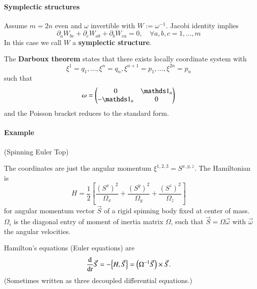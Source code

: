 \paragraph{Symplectic structures}
Assume $m=2n$ even and $\omega$ invertible with $W := \omega^{-1}$. Jacobi identity implies
\begin{equation*}
	\partial_a W_{bc} + \partial_c W_{ab} + \partial_b W_{ca} = 0,\quad \forall a, b, c = 1, \dots, m
\end{equation*}
In this case we call $W$ a \textbf{symplectic structure}.

The \textbf{Darboux theorem} states that there exists locally coordinate system with 
\begin{equation*}
	\xi^1 = q_1, \dots, \xi^n = q_n, \xi^{n+1} = p_1, \dots, \xi^{2n} = p_n
\end{equation*}
such that 
\begin{equation*}
	\omega = \begin{pmatrix} 0 & \id_n \\ -\id_n & 0 \end{pmatrix}
\end{equation*}
and the Poisson bracket reduces to the standard form.

\paragraph{Example} (Spinning Euler Top)

The coordinates are just the angular momentum $\xi^{1, 2, 3} = S^{x, y, z}$. The Hamiltonian is 
\begin{equation*}
	H = \frac{1}{2}\left[ \frac{(S^x)^2}{\Omega_x} + \frac{(S^y)^2}{\Omega_y} + \frac{(S^z)^2}{\Omega_z}\right] 
\end{equation*}
for angular momentum vector $\vec{S}$ of a rigid spinning body fixed at center of mass. $\Omega_i$ is the diagonal entry of moment of inertia matrix $\Omega$, such that $\vec{S} = \Omega \vec{\omega}$ with $\vec{\omega}$ the angular velocities. 

Hamilton's equations (Euler equations) are
\begin{equation*}
	\dv{t} \vec{S} = - \pb{H} {\vec{S}} = \left( \Omega^{-1} \vec{S} \right)  \times \vec{S}.
\end{equation*}
(Sometimes written as three decoupled differential equations.)

